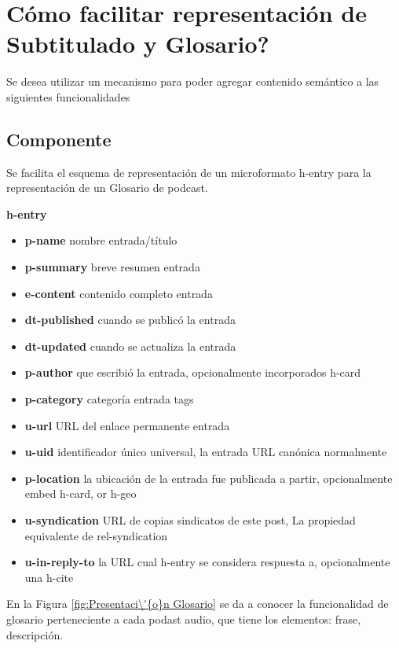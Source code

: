 \section{\textquestiondown C\'{o}mo facilitar representaci\'{o}n de Subtitulado y Glosario?}

Se desea utilizar un mecanismo para poder agregar contenido sem\'{a}ntico a las
siguientes funcionalidades 

\subsection{Componente}

Se facilita el esquema de representaci\'{o}n de un microformato h-entry para la
representaci\'{o}n de un Glosario de podcast. \cite{hEntry}

\textbf{h-entry}

\begin{itemize}

\item \textbf{p-name} nombre entrada/t\'{i}tulo
\item \textbf{p-summary} breve resumen entrada
\item \textbf{e-content} contenido completo entrada
\item \textbf{dt-published} cuando se public\'{o} la entrada
\item \textbf{dt-updated} cuando se actualiza la entrada
\item \textbf{p-author} que escribi\'{o} la entrada, opcionalmente incorporados
h-card
\item \textbf{p-category} categor\'{i}a entrada tags
\item \textbf{u-url} URL del enlace permanente entrada
\item \textbf{u-uid} identificador \'{u}nico universal, la entrada URL can\'{o}nica
normalmente
\item \textbf{p-location} la ubicaci\'{o}n de la entrada fue publicada a partir,
opcionalmente embed h-card, or h-geo
\item \textbf{u-syndication} URL de copias sindicatos de este post, La propiedad
equivalente de rel-syndication
\item \textbf{u-in-reply-to} la URL cual h-entry se considera respuesta a, 
opcionalmente una h-cite

\end{itemize}

En la Figura \ref{fig:Presentaci\'{o}n Glosario} se da a conocer la funcionalidad
de glosario perteneciente a cada podast audio, que tiene los elementos: frase,
descripci\'{o}n.

